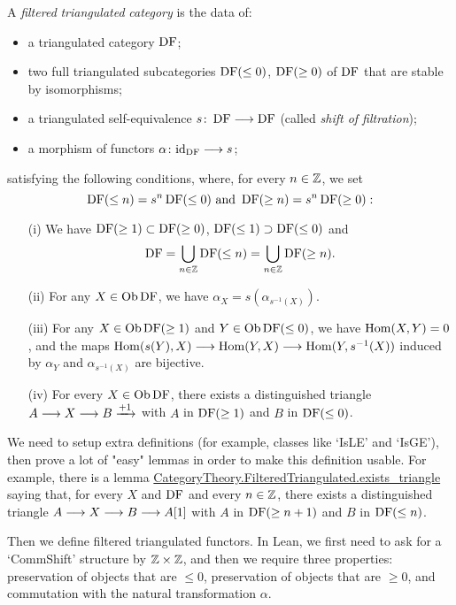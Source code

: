 \begin{definition}
\label{def-FilteredTriangulated}
\leanok
A \textit{filtered} \textit{triangulated} \textit{category} is the data of:
\begin{itemize}
\item a triangulated category $\operatorname{DF}$;
\item two full triangulated subcategories $\operatorname{DF}(\leq 0)$, $\operatorname{DF}(\geq 0)$ of $\operatorname{DF}$ that are stable by isomorphisms;
\item a triangulated self-equivalence $s\colon \operatorname{DF}\longrightarrow\operatorname{DF}$ (called \emph{shift of filtration});
\item a morphism of functors $\alpha\colon \mathrm{id}_{\operatorname{DF}}\longrightarrow s$;

\end{itemize}
satisfying the following conditions, where, for every $n\in\mathbb{Z}$, we set
\[\operatorname{DF}(\leq n)=s^n\operatorname{DF}(\leq 0)\mbox{ and }\operatorname{DF}(\geq n)=s^n\operatorname{DF}(\geq 0):\]
\begin{itemize}
\item[(i)] We have $\operatorname{DF}(\geq 1)\subset\operatorname{DF}(\geq 0)$, $\operatorname{DF}(\leq 1)\supset\operatorname{DF}(\leq 0)$ and
\[\operatorname{DF}=\bigcup_{n\in\mathbb{Z}}\operatorname{DF}(\leq n)=\bigcup_{n\in\mathbb{Z}}\operatorname{DF}(\geq n).\]
\item[(ii)] For any $X\in\operatorname{\mathrm{Ob}}\operatorname{DF}$, we have $\alpha_X=s(\alpha_{s^{-1}(X)})$.
\item[(iii)] For any $X\in\operatorname{\mathrm{Ob}}\operatorname{DF}(\geq 1)$ and $Y\in\operatorname{\mathrm{Ob}}\operatorname{DF}(\leq 0)$, we have $\operatorname{Hom}(X,Y)=0$, and the maps $\operatorname{Hom}(s(Y),X)\longrightarrow\operatorname{Hom}(Y,X)\longrightarrow\operatorname{Hom}(Y,s^{-1}(X))$ induced
by $\alpha_Y$ and $\alpha_{s^{-1}(X)}$ are bijective.
\item[(iv)] For every $X\in\operatorname{\mathrm{Ob}}\operatorname{DF}$, there exists a distinguished triangle $A\longrightarrow X\longrightarrow B\xrightarrow{+1}$ with $A$ in $\operatorname{DF}(\geq 1)$ and $B$ in $\operatorname{DF}(\leq 0)$.
\end{itemize}

\end{definition}

We need to setup extra definitions (for example, classes like `IsLE' and `IsGE'), then prove a lot of "easy" lemmas in order
to make this definition usable. For example, there is a lemma \url{CategoryTheory.FilteredTriangulated.exists_triangle} saying that, for
every $X$ and $\operatorname{DF}$ and every $n\in\mathbb{Z}$, there exists a distinguished triangle $A\longrightarrow X\longrightarrow B \longrightarrow A[1]$ with $A$ in $\operatorname{DF}(\ge n + 1)$
and $B$ in $\operatorname{DF}(\le n)$.

Then we define filtered triangulated functors. In Lean, we first need to ask for a `CommShift' structure by $\mathbb{Z}\times\mathbb{Z}$, and then 
we require three properties: preservation of objects that are $\le 0$, preservation of objects that are $\ge 0$, and commutation with
the natural transformation $\alpha$.


